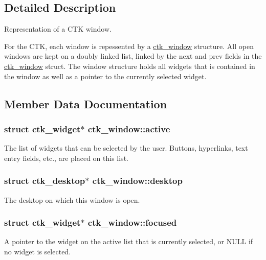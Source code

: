 \subsection{Detailed Description}
Representation of a C\+T\+K window.

For the C\+T\+K, each window is repessented by a \hyperlink{structctk__window}{ctk\+\_\+window} structure. All open windows are kept on a doubly linked list, linked by the next and prev fields in the \hyperlink{structctk__window}{ctk\+\_\+window} struct. The window structure holds all widgets that is contained in the window as well as a pointer to the currently selected widget. 

\subsection{Member Data Documentation}
\hypertarget{structctk__window_ad5cf5ddb025397eb66da6753ce8492a4}{}
\subsubsection[{active}]{\setlength{\rightskip}{0pt plus 5cm}struct {\bf ctk\+\_\+widget}$\ast$ ctk\+\_\+window\+::active}\label{structctk__window_ad5cf5ddb025397eb66da6753ce8492a4}
The list of widgets that can be selected by the user. Buttons, hyperlinks, text entry fields, etc., are placed on this list. \hypertarget{structctk__window_a7764e1224f692ae285ef706eb361991f}{}
\subsubsection[{desktop}]{\setlength{\rightskip}{0pt plus 5cm}struct {\bf ctk\+\_\+desktop}$\ast$ ctk\+\_\+window\+::desktop}\label{structctk__window_a7764e1224f692ae285ef706eb361991f}
The desktop on which this window is open. \hypertarget{structctk__window_aace937271af9c37837634f8dedcb0cf1}{}
\subsubsection[{focused}]{\setlength{\rightskip}{0pt plus 5cm}struct {\bf ctk\+\_\+widget}$\ast$ ctk\+\_\+window\+::focused}\label{structctk__window_aace937271af9c37837634f8dedcb0cf1}
A pointer to the widget on the active list that is currently selected, or N\+U\+L\+L if no widget is selected. \hypertarget{structctk__window_ae2d4a4d04e07beaf18e7581f42d317dc}{}

